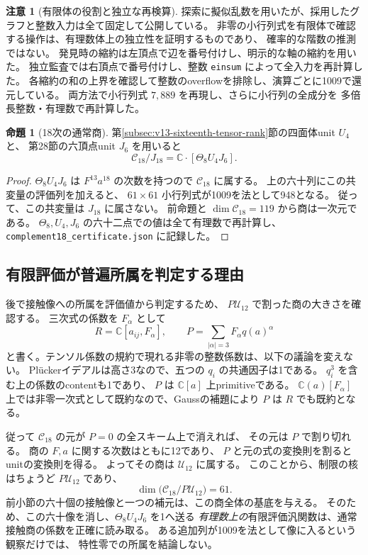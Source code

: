 \documentclass[a4paper,11pt]{ltjsarticle}
\theoremstyle{definition}
\newtheorem{remark}[theorem]{注意}
\newtheorem{proposition}[theorem]{命題}
\newcommand{\CC}{\mathbb C}
\begin{document}
\begin{remark}[有限体の役割と独立な再検算]
探索に擬似乱数を用いたが、採用したグラフと整数入力は全て固定して公開している。
非零の小行列式を有限体で確認する操作は、有理数体上の独立性を証明するものであり、
確率的な階数の推測ではない。
発見時の縮約は左頂点で辺を番号付けし、明示的な軸の縮約を用いた。
独立監査では右頂点で番号付けし、整数 \texttt{einsum} によって全入力を再計算した。
各縮約の和の上界を確認して整数のoverflowを排除し、演算ごとに1009で還元している。
両方法で小行列式 $7,889$ を再現し、さらに小行列の全成分を
多倍長整数・有理数で再計算した。
\end{remark}

\begin{proposition}[18次の通常商]
\label{prop:v14-ordinary-eighteenth-quotient}
第\ref{subsec:v13-sixteenth-tensor-rank}節の四面体unit $U_4$ と、
第28節の六頂点unit $J_6$ を用いると
\[
                   \mathcal C_{18}/J_{18}
                         =\CC\cdot[\Theta_8U_4J_6].
\]
\end{proposition}
\begin{proof}
$\Theta_8U_4J_6$ は $F^{13}a^{18}$ の次数を持つので
$\mathcal C_{18}$ に属する。
上の六十列にこの共変量の評価列を加えると、
$61\times61$ 小行列式が1009を法として948となる。
従って、この共変量は $J_{18}$ に属さない。
前命題と $\dim\mathcal C_{18}=119$ から商は一次元である。
$\Theta_8,U_4,J_6$ の六十二点での値は全て有理数で再計算し、
\texttt{complement18\_certificate.json} に記録した。
\end{proof}

\subsection{有限評価が普遍所属を判定する理由}
\label{subsec:v14-evaluation-and-divisibility}

後で接触像への所属を評価値から判定するため、
$P\mathcal U_{12}$ で割った商の大きさを確認する。
三次式の係数を $F_\alpha$ として
\[
 R=\CC[a_{ij},F_\alpha],\qquad
 P=\sum_{|\alpha|=3}F_\alpha q(a)^\alpha
\]
と書く。テンソル係数の規約で現れる非零の整数係数は、以下の議論を変えない。
Pl\"uckerイデアルは高さ3なので、五つの $q_i$ の共通因子は1である。
$q_i^3$ を含む上の係数のcontentも1であり、
$P$ は $\CC[a]$ 上primitiveである。
$\CC(a)[F_\alpha]$ 上では非零一次式として既約なので、Gaussの補題により
$P$ は $R$ でも既約となる。

従って $\mathcal C_{18}$ の元が $P=0$ の全スキーム上で消えれば、
その元は $P$ で割り切れる。
商の $F,a$ に関する次数はともに12であり、
$P$ と元の式の変換則を割るとunitの変換則を得る。
よってその商は $\mathcal U_{12}$ に属する。
このことから、制限の核はちょうど $P\mathcal U_{12}$ であり、
\[
                         \dim\bigl(\mathcal C_{18}/P\mathcal U_{12}\bigr)=61.
\]
前小節の六十個の接触像と一つの補元は、この商全体の基底を与える。
そのため、この六十像を消し、$\Theta_8U_4J_6$ を1へ送る
\emph{有理数上の}有限評価汎関数は、通常接触商の係数を正確に読み取る。
ある追加列が1009を法として像に入るという観察だけでは、
特性零での所属を結論しない。
\end{document}
